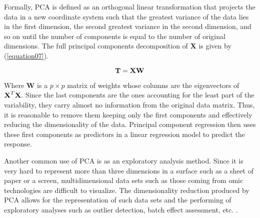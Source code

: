 Formally, PCA is defined as an orthogonal linear transformation that projects the data in a new coordinate system such that the greatest variance of the data lies in the first dimension, the second greatest variance in the second dimension, and so on until the number of components is equal to the number of original dimensions. The full principal components decomposition of \textbf{X} is given by (\autoref{equation07}).

\begin{equation}
\label{equation07}
\textbf{\text{T}} = \textbf{\text{XW}}
\end{equation}

Where \textbf{W} is a $p \times p$ matrix of weights whose columns are the eigenvectors of $\textbf{\text{X}}^T\textbf{\text{X}}$. Since the last components are the ones accounting for the least part of the variability, they carry almost no information from the original data matrix. Thus, it is reasonable to remove them keeping only the first components and effectively reducing the dimensionality of the data. Principal component regression then uses these first components as predictors in a linear regression model to predict the response.

Another common use of PCA is as an exploratory analysis method. Since it is very hard to represent more than three dimensions in a surface such as a sheet of paper or a screen, multidimensional data sets such as those coming from omic technologies are difficult to visualize. The dimensionality reduction produced by PCA allows for the representation of such data sets and the performing of exploratory analyses such as outlier detection, batch effect assessment, etc. \parencite{meglen1992examining}.
